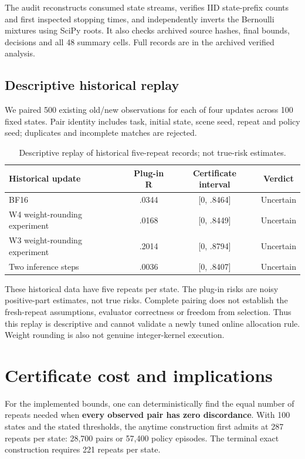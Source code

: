 \documentclass[conference]{IEEEtran}
\begin{document}
The audit reconstructs consumed state streams, verifies IID state-prefix counts and first inspected stopping times, and independently inverts the Bernoulli mixtures using SciPy roots. It also checks archived source hashes, final bounds, decisions and all 48 summary cells. Full records are in the archived verified analysis.

\subsection{Descriptive historical replay}

We paired 500 existing old/new observations for each of four updates across 100 fixed states. Pair identity includes task, initial state, scene seed, repeat and policy seed; duplicates and incomplete matches are rejected.

\begin{table}[t]\centering\caption{Descriptive replay of historical five-repeat records; not true-risk estimates.}\small
\begin{tabular}{lccc}\toprule
Historical update & Plug-in R & Certificate interval & Verdict \\
\midrule
BF16 & .0344 & [0, .8464] & Uncertain \\
W4 weight-rounding experiment & .0168 & [0, .8449] & Uncertain \\
W3 weight-rounding experiment & .2014 & [0, .8794] & Uncertain \\
Two inference steps & .0036 & [0, .8407] & Uncertain \\
\bottomrule\end{tabular}
\end{table}

These historical data have five repeats per state. The plug-in risks are noisy positive-part estimates, not true risks. Complete pairing does not establish the fresh-repeat assumptions, evaluator correctness or freedom from selection. Thus this replay is descriptive and cannot validate a newly tuned online allocation rule. Weight rounding is also not genuine integer-kernel execution.

\section{Certificate cost and implications}

For the implemented bounds, one can deterministically find the equal number of repeats needed when \textbf{every observed pair has zero discordance}. With 100 states and the stated thresholds, the anytime construction first admits at 287 repeats per state: 28,700 pairs or 57,400 policy episodes. The terminal exact construction requires 221 repeats per state.
\end{document}
